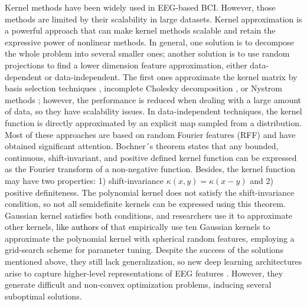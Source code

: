 Kernel methods have been widely used in EEG-based BCI. However, those methods are limited by their scalability in large datasets.  Kernel approximation is a powerful approach that can make kernel methods scalable and retain the expressive power of nonlinear methods. In general, one solution is to decompose the whole problem into several smaller ones; another solution is to use random projections to find a lower dimension feature approximation, either data-dependent or data-independent. The first ones approximate the kernel matrix by basis selection techniques \cite{smola2000sparse}, incomplete Cholesky decomposition \cite{fine2001efficient}, or Nystrom methods \cite{williams2001using}; however, the performance is reduced when dealing with a large amount of data, so they have scalability issues. In data-independent techniques, the kernel function is directly approximated by an explicit map sampled from a distribution. Most of these approaches are based on random Fourier features (RFF) and have obtained significant attention. Bochner´s theorem states that any bounded, continuous, shift-invariant, and positive defined kernel function can be expressed as the Fourier transform of a non-negative function. Besides,  the kernel function may have two properties: 1) shift-invariance $\kappa(x,y)=\kappa(x-y)$ and 2) positive definiteness. The polynomial kernel does not satisfy the shift-invariance condition, so not all semidefinite kernels can be expressed using this theorem. Gaussian kernel satisfies both conditions, and researchers use it to approximate other kernels, \textcolor{black}{like authors of \cite{roweis1999unifying}} that empirically use ten Gaussian kernels to approximate the polynomial kernel with spherical random features, employing a grid-search scheme for parameter tuning. Despite the success of the solutions mentioned above, they still lack generalization, so new deep learning architectures arise to capture higher-level representations of EEG features \cite{li2021fft}. However, they generate difficult and non-convex optimization problems, inducing several suboptimal solutions.

